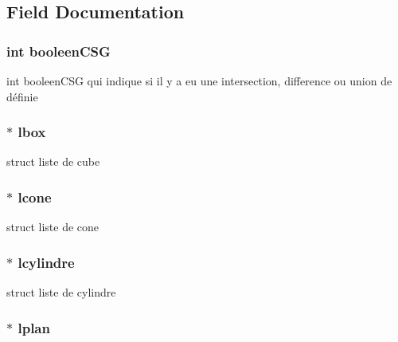 \subsection{Field Documentation}
\hypertarget{structobjet_c_s_g_a4428e32d4383f7dee25e5a4cb192da24}{
\subsubsection[{booleenCSG}]{\setlength{\rightskip}{0pt plus 5cm}int {\bf booleenCSG}}}
\label{structobjet_c_s_g_a4428e32d4383f7dee25e5a4cb192da24}
int booleenCSG qui indique si il y a eu une intersection, difference ou union de définie \hypertarget{structobjet_c_s_g_a5b7114d3e4c7527479db2477acc69180}{
\subsubsection[{lbox}]{$\ast$ {\bf lbox}}}
\label{structobjet_c_s_g_a5b7114d3e4c7527479db2477acc69180}
struct liste de cube \hypertarget{structobjet_c_s_g_aa328f20993d25abe873904ada1aadad0}{
\subsubsection[{lcone}]{$\ast$ {\bf lcone}}}
\label{structobjet_c_s_g_aa328f20993d25abe873904ada1aadad0}
struct liste de cone \hypertarget{structobjet_c_s_g_a28b52bc13fd24dcd25e9e9d6c073ee97}{
\subsubsection[{lcylindre}]{$\ast$ {\bf lcylindre}}}
\label{structobjet_c_s_g_a28b52bc13fd24dcd25e9e9d6c073ee97}
struct liste de cylindre \hypertarget{structobjet_c_s_g_a6c0864a0bbb65be0c48b341061498fd9}{
\subsubsection[{lplan}]{$\ast$ {\bf lplan}}}
